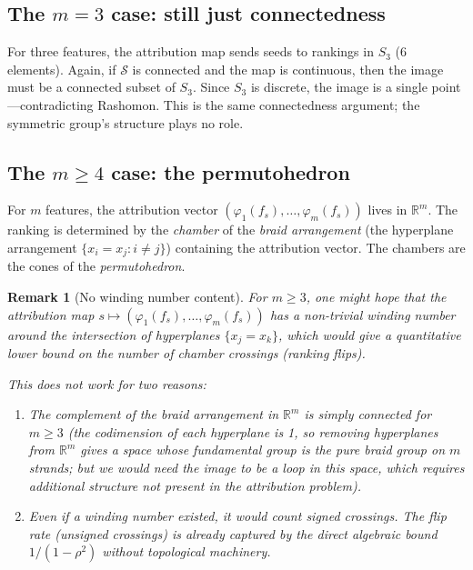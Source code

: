 \documentclass{article}
\newtheorem{remark}[theorem]{Remark}
\begin{document}
\subsection{The $m = 3$ case: still just connectedness}

For three features, the attribution map sends seeds to rankings
in $S_3$ (6 elements). Again, if $\mathcal{S}$ is connected and
the map is continuous, then the image must be a connected subset
of $S_3$. Since $S_3$ is discrete, the image is a single point
---contradicting Rashomon. This is the same connectedness argument;
the symmetric group's structure plays no role.

\subsection{The $m \geq 4$ case: the permutohedron}

For $m$ features, the attribution vector
$(\varphi_1(f_s), \ldots, \varphi_m(f_s))$ lives in $\mathbb{R}^m$.
The ranking is determined by the \emph{chamber} of the
\emph{braid arrangement} (the hyperplane arrangement
$\{x_i = x_j : i \neq j\}$) containing the attribution vector.
The chambers are the cones of the \emph{permutohedron}.

\begin{remark}[No winding number content]
For $m \geq 3$, one might hope that the attribution map
$s \mapsto (\varphi_1(f_s), \ldots, \varphi_m(f_s))$ has a
non-trivial winding number around the intersection of hyperplanes
$\{x_j = x_k\}$, which would give a \emph{quantitative} lower
bound on the number of chamber crossings (ranking flips).

This does not work for two reasons:
\begin{enumerate}
    \item The complement of the braid arrangement in
      $\mathbb{R}^m$ is simply connected for $m \geq 3$
      (the codimension of each hyperplane is 1, so removing
      hyperplanes from $\mathbb{R}^m$ gives a space whose
      fundamental group is the pure braid group on $m$ strands;
      but we would need the image to be a \emph{loop} in this
      space, which requires additional structure not present in
      the attribution problem).
    \item Even if a winding number existed, it would count
      \emph{signed} crossings. The flip rate (unsigned crossings)
      is already captured by the direct algebraic bound
      $1/(1-\rho^2)$ without topological machinery.
\end{enumerate}
\end{remark}
\end{document}
